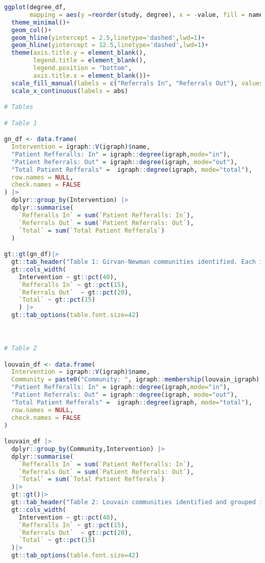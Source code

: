 \documentclass{article}
\begin{document}
\begin{lstlisting}[language=R]
ggplot(degree_df,
       mapping = aes(y =reorder(study, degree), x = -value, fill = name))+
  theme_minimal()+
  geom_col()+
  geom_hline(yintercept = 2.5,linetype='dashed',lwd=1)+
  geom_hline(yintercept = 12.5,linetype='dashed',lwd=1)+
  theme(axis.title.y = element_blank(),
        legend.title = element_blank(),
        legend.position = "bottom",
        axis.title.x = element_blank())+
  scale_fill_manual(labels = c("Referrals In", "Referrals Out"), values = scales::hue_pal()(2))+
  scale_x_continuous(labels = abs)

# Tables

# Table 1

gn_df <- data.frame(
  Intervention = igraph::V(igraph)$name,
  "Patient Refferalls: In" = igraph::degree(igraph,mode="in"),
  "Patient Referrals: Out" = igraph::degree(igraph, mode="out"),
  "Total Patient Refferals" =  igraph::degree(igraph, mode="total"),
  row.names = NULL,
  check.names = FALSE
) |>
  dplyr::group_by(Intervention) |> 
  dplyr::summarise(
    `Refferalls In` = sum(`Patient Refferalls: In`),
    `Referrals Out` = sum(`Patient Referrals: Out`),
    `Total` = sum(`Total Patient Refferals`)
  )

gt::gt(gn_df)|>
  gt::tab_header("Table 1: Girvan-Newman communities identified. Each intervention is their own community.")|>
  gt::cols_width(
    Intervention ~ gt::pct(40),
    `Refferalls In` ~ gt::pct(15),
    `Referrals Out`  ~ gt::pct(20),
    `Total` ~ gt::pct(15)
    ) |>
  gt::tab_options(table.font.size=42)



# Table 2

louvain_df <- data.frame(
  Intervention = igraph::V(igraph)$name,
  Community = paste0("Community: ", igraph::membership(louvain_igraph)|> as.vector()),
  "Patient Refferalls: In" = igraph::degree(igraph,mode="in"),
  "Patient Referrals: Out" = igraph::degree(igraph, mode="out"),
  "Total Patient Refferals" =  igraph::degree(igraph, mode="total"),
  row.names = NULL,
  check.names = FALSE
)

louvain_df |>
  dplyr::group_by(Community,Intervention) |> 
  dplyr::summarise(
    `Refferalls In` = sum(`Patient Refferalls: In`),
    `Referrals Out` = sum(`Patient Referrals: Out`),
    `Total` = sum(`Total Patient Refferals`)
  )|>
  gt::gt()|>
  gt::tab_header("Table 2: Louvain communities identified and grouped interventions.")|>
  gt::cols_width(
    Intervention ~ gt::pct(40),
    `Refferalls In` ~ gt::pct(15),
    `Referrals Out`  ~ gt::pct(20),
    `Total` ~ gt::pct(15)
  )|>
  gt::tab_options(table.font.size=42)




\end{lstlisting}
\end{document}
